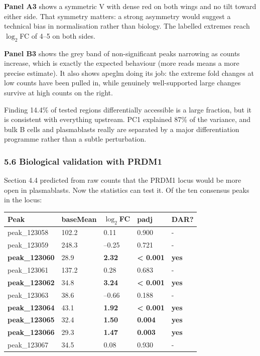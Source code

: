 \documentclass[
  11pt,
  a4paper,
]{article}
\begin{document}
\textbf{Panel A3} shows a symmetric V with dense red on both wings and
no tilt toward either side. That symmetry matters: a strong asymmetry
would suggest a technical bias in normalisation rather than biology. The
labelled extremes reach \textbar{}\(\log_2\)FC\textbar{} of 4--5 on both
sides.

\textbf{Panel B3} shows the grey band of non-significant peaks narrowing
as counts increase, which is exactly the expected behaviour (more reads
means a more precise estimate). It also shows apeglm doing its job: the
extreme fold changes at low counts have been pulled in, while genuinely
well-supported large changes survive at high counts on the right.

Finding 14.4\% of tested regions differentially accessible is a large
fraction, but it is consistent with everything upstream. PC1 explained
87\% of the variance, and bulk B cells and plasmablasts really are
separated by a major differentiation programme rather than a subtle
perturbation.

\hypertarget{biological-validation-with-prdm1}{%
\subsubsection{5.6 Biological validation with
PRDM1}\label{biological-validation-with-prdm1}}

Section 4.4 predicted from raw counts that the PRDM1 locus would be more
open in plasmablasts. Now the statistics can test it. Of the ten
consensus peaks in the locus:

\begin{longtable}[]{@{}lllll@{}}
\toprule\noalign{}
Peak & baseMean & \(\log_2\)FC & padj & DAR? \\
\midrule\noalign{}
\endhead
\bottomrule\noalign{}
\endlastfoot
peak\_123058 & 102.2 & 0.11 & 0.900 & - \\
peak\_123059 & 248.3 & --0.25 & 0.721 & - \\
\textbf{peak\_123060} & 28.9 & \textbf{2.32} & \textbf{\textless{}
0.001} & \textbf{yes} \\
peak\_123061 & 137.2 & 0.28 & 0.683 & - \\
\textbf{peak\_123062} & 34.8 & \textbf{3.24} & \textbf{\textless{}
0.001} & \textbf{yes} \\
peak\_123063 & 38.6 & --0.66 & 0.188 & - \\
\textbf{peak\_123064} & 43.1 & \textbf{1.92} & \textbf{\textless{}
0.001} & \textbf{yes} \\
\textbf{peak\_123065} & 32.4 & \textbf{1.50} & \textbf{0.004} &
\textbf{yes} \\
\textbf{peak\_123066} & 29.3 & \textbf{1.47} & \textbf{0.003} &
\textbf{yes} \\
peak\_123067 & 34.5 & 0.08 & 0.930 & - \\
\end{longtable}
\end{document}

